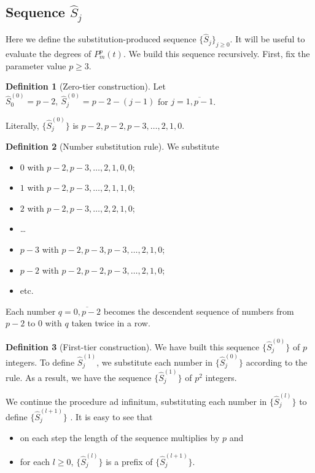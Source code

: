 \documentclass[a4paper]{article}
\theoremstyle{plain}
\theoremstyle{definition}
\newtheorem{definition}{Definition}
\begin{document}
\subsection{Sequence $\hat{S}_j$}
Here we define the substitution-produced sequence $\{\hat{S}_j\}_{j \ge 0}$. It will be useful to evaluate the degrees of $P_m^p(t)$. We build this sequence recursively. First, fix the parameter value $p \ge 3$.
\begin{definition}[Zero-tier construction]
Let $\hat{S}_0^{(0)} = p-2,\ \hat{S}_j^{(0)} = p-2-(j-1)$ for $j = \overline{1, p-1}$.
\end{definition}
Literally, $\{ \hat{S}_j^{(0)}\}$ is $p-2, p-2, p-3, \ldots, 2, 1, 0$.
\begin{definition} [Number substitution rule]
We substitute
\begin{itemize}
 \item $0$ with $p-2, p-3, \ldots, 2, 1, 0, 0$;
 \item $1$ with $p-2, p-3, \ldots, 2, 1, 1, 0$;
 \item $2$ with $p-2, p-3, \ldots, 2, 2, 1, 0$;
 \item \ldots
 \item $p-3$ with $p-2, p-3, p-3, \ldots, 2, 1, 0$;
 \item $p-2$ with $p-2, p-2, p-3, \ldots, 2, 1, 0$;

 \item etc.
 \end{itemize}
 Each number $q = \overline{0, p-2}$ becomes the descendent sequence of numbers from $p-2$ to $0$ with $q$ taken twice in a row.
\end{definition}
\begin{definition}[First-tier construction]\label{tier1}
 We have built this sequence $\{ \hat{S}_j^{(0)}\}$  of $p$ integers. To define 
$\hat{S}_j^{(1)}$, we substitute each number in $\{ \hat{S}_j^{(0)}\}$ according to the rule. As a result, we have the sequence $\{\hat{S}_j^{(1)}\}$ of $p^2$ integers.
\end{definition}
We continue the procedure ad infinitum, substituting each number in $\{ \hat{S}_j^{(l)}\}$  to define $\{ \hat{S}_j^{(l+1)}\}$ . It is easy to see that
\begin{itemize}
\item on each step the length of the sequence multiplies by $p$ and
\item for each $l \ge 0$,  $\{ \hat{S}_j^{(l)}\}$ is a prefix of $\{ \hat{S}_j^{(l+1)}\}$.
\end{itemize}
\end{document}
